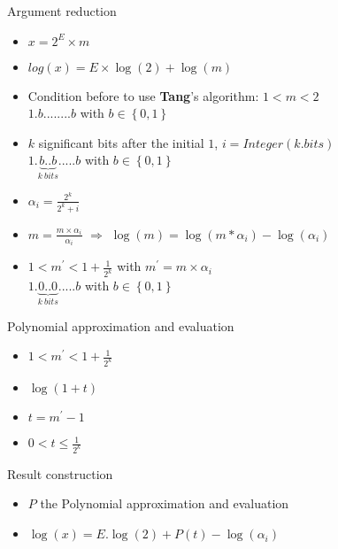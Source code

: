 \begin{frame}{Argument reduction}

   \begin{itemize}
       \item <1-> $x = 2^E \times m$
        \item <2-> $log(x) = E \times \log(2)+\log(m)$
        \item <3-> Condition before to use \textbf{Tang}'s algorithm: $1 < m < 2$\\
          $1.b........b$ with $b \in \left\{0,1 \right\}$
        \item <4-> $k$ significant bits after the initial $1$, $i = Integer(k.bits)$\\
        $1.\underbrace{b..b}_{k \ bits}.....b$ with $b \in \left\{0,1 \right\}$
        \item <5-> $\alpha_i = \frac{2^k}{2^k+i}$ 
        \item <6-> $m= \frac{m \times \alpha_i}{\alpha_i}$ $\Rightarrow$ $\log(m) = \log(m * \alpha_i) - \log(\alpha_i)$
        \item <7-> $1 < m^{\prime} < 1+\frac{1}{2^k}$ with $m^{'} = m \times \alpha_i$\\
        $1.\underbrace{0..0}_{k \ bits}.....b$ with $b \in \left\{0,1 \right\}$
        \end{itemize}
\end{frame}

\begin{frame}{Polynomial approximation and evaluation}
\begin{itemize}
    \item <1-> $1 < m^{\prime} < 1+\frac{1}{2^k}$
    \item <2-> $\log(1+t)$ 
    \item <3-> $t =  m^{\prime} - 1$ 
    \item <4-> $0 < t \le \frac{1}{2^k} $
\end{itemize}
\end{frame}

\begin{frame}{Result construction}
    \begin{itemize}
        \item $P$ the Polynomial approximation and evaluation
        \item $\log(x) = E.\log(2) +P(t) - \log(\alpha_i)$
    \end{itemize}
\end{frame}
